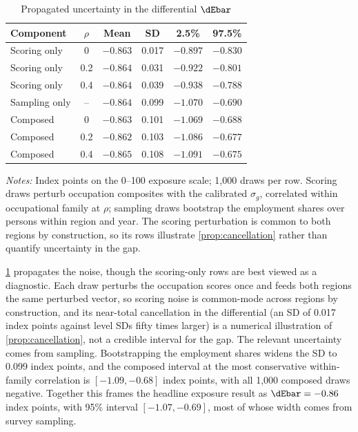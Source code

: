 \begin{table}[t]
\centering
\caption{Propagated uncertainty in the differential $\dEbar$}
\label{tab:propagation}
\small
\begin{tabular}{lccccc}
\toprule
Component & $\rho$ & Mean & SD & 2.5\% & 97.5\% \\
\midrule
Scoring only  & 0   & $-0.863$ & 0.017 & $-0.897$ & $-0.830$ \\
Scoring only  & 0.2 & $-0.864$ & 0.031 & $-0.922$ & $-0.801$ \\
Scoring only  & 0.4 & $-0.864$ & 0.039 & $-0.938$ & $-0.788$ \\
Sampling only & --  & $-0.864$ & 0.099 & $-1.070$ & $-0.690$ \\
Composed      & 0   & $-0.863$ & 0.101 & $-1.069$ & $-0.688$ \\
Composed      & 0.2 & $-0.862$ & 0.103 & $-1.086$ & $-0.677$ \\
Composed      & 0.4 & $-0.865$ & 0.108 & $-1.091$ & $-0.675$ \\
\bottomrule
\end{tabular}
\begin{minipage}{0.92\textwidth}
\vspace{0.4em}\footnotesize
\textit{Notes:} Index points on the 0--100 exposure scale; 1,000 draws per row. Scoring draws perturb occupation composites with the calibrated $\sigma_g$, correlated within occupational family at $\rho$; sampling draws bootstrap the employment shares over persons within region and year. The scoring perturbation is common to both regions by construction, so its rows illustrate \cref{prop:cancellation} rather than quantify uncertainty in the gap. 
\end{minipage}
\end{table}
 
\cref{tab:propagation} propagates the noise, though the scoring-only rows are best viewed as a diagnostic. Each draw perturbs the occupation scores once and feeds both regions the same perturbed vector, so scoring noise is common-mode across regions by construction, and its near-total cancellation in the differential (an SD of 0.017 index points against level SDs fifty times larger) is a numerical illustration of \cref{prop:cancellation}, not a credible interval for the gap. The relevant uncertainty comes from sampling. Bootstrapping the employment shares widens the SD to 0.099 index points, and the composed interval at the most conservative within-family correlation is $[-1.09, -0.68]$ index points, with all 1,000 composed draws negative. Together this frames the headline exposure result as $\dEbar = -0.86$ index points, with 95\% interval $[-1.07, -0.69]$, most of whose width comes from survey sampling.
 
